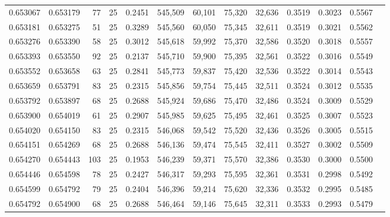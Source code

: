 \begin{tabular}{rrrrrrrrrrrrr}
0.653067 & 0.653179 &    77 &  25 &                                     0.2451 & 545,509 &  60,101 &  75,320 &  32,636 & 0.3519 & 0.3023 & 0.5567 \\
0.653181 & 0.653275 &    51 &  25 &                                     0.3289 & 545,560 &  60,050 &  75,345 &  32,611 & 0.3519 & 0.3021 & 0.5562 \\
0.653276 & 0.653390 &    58 &  25 &                                     0.3012 & 545,618 &  59,992 &  75,370 &  32,586 & 0.3520 & 0.3018 & 0.5557 \\
0.653393 & 0.653550 &    92 &  25 &                                     0.2137 & 545,710 &  59,900 &  75,395 &  32,561 & 0.3522 & 0.3016 & 0.5549 \\
0.653552 & 0.653658 &    63 &  25 &                                     0.2841 & 545,773 &  59,837 &  75,420 &  32,536 & 0.3522 & 0.3014 & 0.5543 \\
0.653659 & 0.653791 &    83 &  25 &                                     0.2315 & 545,856 &  59,754 &  75,445 &  32,511 & 0.3524 & 0.3012 & 0.5535 \\
0.653792 & 0.653897 &    68 &  25 &                                     0.2688 & 545,924 &  59,686 &  75,470 &  32,486 & 0.3524 & 0.3009 & 0.5529 \\
0.653900 & 0.654019 &    61 &  25 &                                     0.2907 & 545,985 &  59,625 &  75,495 &  32,461 & 0.3525 & 0.3007 & 0.5523 \\
0.654020 & 0.654150 &    83 &  25 &                                     0.2315 & 546,068 &  59,542 &  75,520 &  32,436 & 0.3526 & 0.3005 & 0.5515 \\
0.654151 & 0.654269 &    68 &  25 &                                     0.2688 & 546,136 &  59,474 &  75,545 &  32,411 & 0.3527 & 0.3002 & 0.5509 \\
0.654270 & 0.654443 &   103 &  25 &                                     0.1953 & 546,239 &  59,371 &  75,570 &  32,386 & 0.3530 & 0.3000 & 0.5500 \\
0.654446 & 0.654598 &    78 &  25 &                                     0.2427 & 546,317 &  59,293 &  75,595 &  32,361 & 0.3531 & 0.2998 & 0.5492 \\
0.654599 & 0.654792 &    79 &  25 &                                     0.2404 & 546,396 &  59,214 &  75,620 &  32,336 & 0.3532 & 0.2995 & 0.5485 \\
0.654792 & 0.654900 &    68 &  25 &                                     0.2688 & 546,464 &  59,146 &  75,645 &  32,311 & 0.3533 & 0.2993 & 0.5479 \\

\end{tabular}
